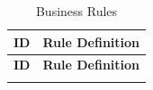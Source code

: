 \renewcommand{\arraystretch}{1.5}

\begin{longtable}{|c|p{12cm}|}

\caption{Business Rules}
\label{tab:businessrules}
\\

\hline
\rowcolor{headerbg} 
\textbf{ID} 
&
\centering\arraybackslash\textbf{Rule Definition}
\\ \hline
\endfirsthead

\hline
\rowcolor{headerbg}
\textbf{ID}
&
\centering\arraybackslash\textbf{Rule Definition}
\\ \hline
\endhead

\hline
\endfoot

\hline
\endlastfoot


\end{longtable}
